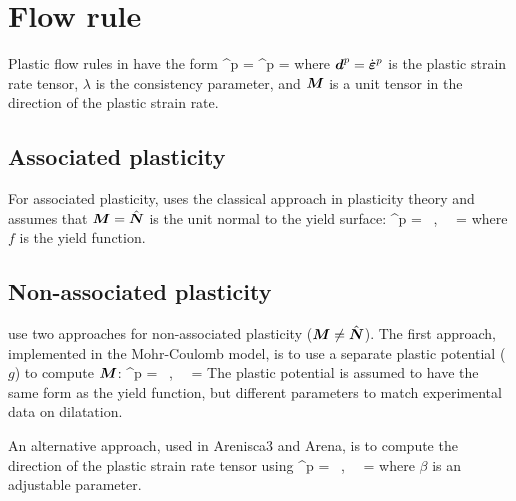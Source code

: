 \chapter{Flow rule}
Plastic flow rules in \Vaango have the form
\Beq \label{eq:flow_rule}
  \BdT^p = \dot{\BVeps}^p = \dot{\lambda}\BM
\Eeq
where $\boldsymbol{d}^p = \dot{\boldsymbol{\varepsilon}}^p$ is the plastic strain rate tensor, $\lambda$ is 
the consistency parameter, and $\boldsymbol{M}$ is a unit tensor in the direction of the
plastic strain rate.

\section{Associated plasticity}
For associated plasticity, \Vaango uses the classical approach in plasticity theory
and assumes that $\boldsymbol{M} = \hat{\boldsymbol{N}}$ is the unit normal to the yield surface:
\Beq
  \dot{\BVeps}^p = \dot{\lambda}\hat{\BN} 
  ~,~~ \hat{\BN} = 
\Eeq
where $f$ is the yield function.

\section{Non-associated plasticity}
\Vaango use two approaches for non-associated plasticity ($\boldsymbol{M} \ne \hat{\boldsymbol{N}}$).  
The first approach, implemented in the Mohr-Coulomb model, is to use a separate
plastic potential ($g$) to compute $\boldsymbol{M}$:
\Beq
  \dot{\BVeps}^p = \dot{\lambda} \hat{\BM} 
  ~,~~ \hat{\BM} = 
\Eeq
The plastic potential is assumed to have the same form as the yield function,
but different parameters to match experimental data on dilatation.

An alternative approach, used in Arenisca3 and Arena, is to compute the
direction of the plastic strain rate tensor using
\Beq
  \dot{\BVeps}^p = \dot{\lambda} \hat{\BM} 
  ~,~~ \hat{\BM} = \frac{\Dev(\BN) + \beta\, \Tr(\BN)}{\Norm{\Dev(\BN) + \beta\, \Tr(\BN)}{}}
\Eeq
where $\beta$ is an adjustable parameter.

